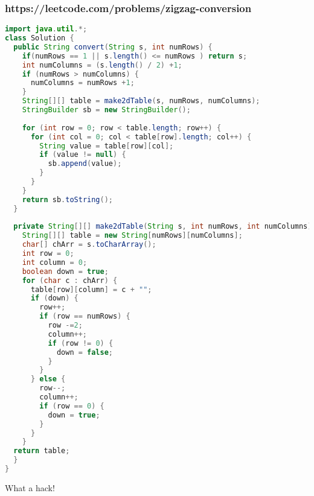 \documentclass[12pt]{article}
\begin{document}
\subsubsection{https://leetcode.com/problems/zigzag-conversion}
\begin{lstlisting}[language=Java]
import java.util.*;
class Solution {
  public String convert(String s, int numRows) {
    if(numRows == 1 || s.length() <= numRows ) return s;
    int numColumns = (s.length() / 2) +1;
    if (numRows > numColumns) {
      numColumns = numRows +1;
    }
    String[][] table = make2dTable(s, numRows, numColumns);
    StringBuilder sb = new StringBuilder();
        
    for (int row = 0; row < table.length; row++) {
      for (int col = 0; col < table[row].length; col++) {
        String value = table[row][col];
        if (value != null) {
          sb.append(value);
        }
      }
    }
    return sb.toString();
  }
    
  private String[][] make2dTable(String s, int numRows, int numColumns) {
    String[][] table = new String[numRows][numColumns];
    char[] chArr = s.toCharArray();
    int row = 0;
    int column = 0;
    boolean down = true;
    for (char c : chArr) {
      table[row][column] = c + "";
      if (down) {
        row++;
        if (row == numRows) {
          row -=2;
          column++;
          if (row != 0) {
            down = false;
          }
        }
      } else {
        row--;
        column++;
        if (row == 0) {
          down = true;
        }
      }
    }
  return table;
  }   
}
\end{lstlisting}
What a hack!
\end{document}
